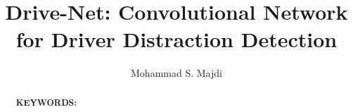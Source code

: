 \documentclass[conference,compsoc]{IEEEtran}
\begin{document}
\title{Drive-Net: Convolutional Network for Driver Distraction Detection}
\author{Mohammad S. Majdi}

\maketitle

\begin{abstract}


\textbf{KEYWORDS:}

\end{abstract}







\end{document}
